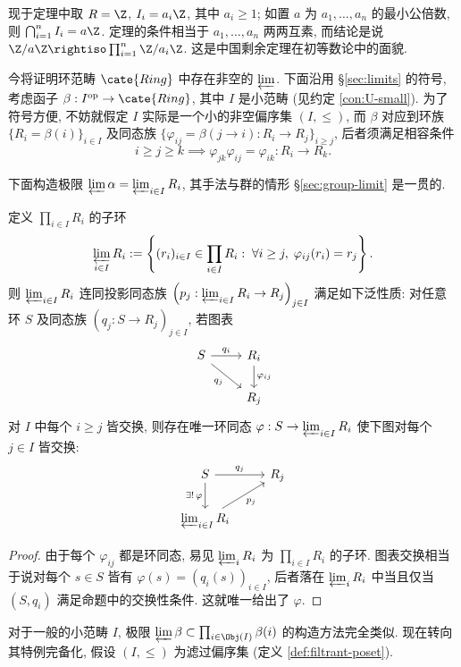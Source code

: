 现于定理中取 $R=\Z$, $I_i = a_i \Z$, 其中 $a_i \geq 1$; 如置 $a$ 为 $a_1, \ldots, a_n$ 的最小公倍数, 则 $\bigcap_{i=1}^n I_i = a\Z$. 定理的条件相当于 $a_1, \ldots, a_n$ 两两互素, 而结论是说 $\Z/a\Z \rightiso \prod_{i=1}^n \Z/a_i\Z$. 这是中国剩余定理在初等数论中的面貌.

今将证明环范畴 $\cate{Ring}$  中存在非空的 $\varprojlim$. 下面沿用 \S\ref{sec:limits} 的符号, 考虑函子 $\beta: I^\text{op} \to \cate{Ring}$, 其中 $I$ 是小范畴 (见约定 \ref{con:U-small}). 为了符号方便, 不妨就假定 $I$ 实际是一个小的非空偏序集 $(I, \leq)$, 而 $\beta$ 对应到环族 $\{R_i = \beta(i) \}_{i \in I}$ 及同态族 $\{\varphi_{ij} = \beta(j \to i): R_i \to R_j \}_{i \geq j}$, 后者须满足相容条件
\[ i \geq j \geq k \implies \varphi_{jk} \varphi_{ij} = \varphi_{ik}: R_i \to R_k. \]

下面构造极限 $\varprojlim \alpha = \varprojlim_{i \in I} R_i$, 其手法与群的情形 \S\ref{sec:group-limit} 是一贯的.

\begin{proposition}
	定义 $\prod_{i \in I} R_i$ 的子环
	\[ \varprojlim_{i \in I} R_i := \left\{ (r_i)_{i \in I} \in \prod_{i \in I} R_i : \; \forall i \geq j,\; \varphi_{ij}(r_i) = r_j \right\}. \]
	则 $\varprojlim_{i \in I} R_i$ 连同投影同态族 $\left( p_j: \varprojlim_{i \in I} R_i \to R_j \right)_{j \in I}$ 满足如下泛性质: 对任意环 $S$ 及同态族 $(q_j: S \to R_j)_{j \in I}$, 若图表
	\[ \begin{tikzcd}
		S \arrow[r, "q_i"] \arrow[rd, "q_j"'] & R_i \arrow[d, "\varphi_{ij}"] \\
		&  R_j
	\end{tikzcd} \]
	对 $I$ 中每个 $i \geq j$ 皆交换, 则存在唯一环同态 $\varphi: S \to \varprojlim_{i \in I} R_i$ 使下图对每个 $j \in I$ 皆交换:
	\[ \begin{tikzcd}
		S \arrow[r, "q_j"] \arrow[d, "{\exists! \, \varphi}"'] & R_j \\
		\varprojlim_{i \in I} R_i \arrow[ru, "p_j"'] &
	\end{tikzcd} \]
\end{proposition}
\begin{proof}
	由于每个 $\varphi_{ij}$ 都是环同态, 易见 $\varprojlim_i R_i$ 为 $\prod_{i \in I} R_i$ 的子环. 图表交换相当于说对每个 $s \in S$ 皆有 $\varphi(s) = (q_i(s))_{i \in I}$, 后者落在 $\varprojlim_i R_i$ 中当且仅当 $(S, q_i)$ 满足命题中的交换性条件. 这就唯一给出了 $\varphi$.
\end{proof}

对于一般的小范畴 $I$, 极限 $\varprojlim \beta \subset \prod_{i \in \Obj(I)} \beta(i)$ 的构造方法完全类似. 现在转向其特例完备化, 假设 $(I, \leq)$ 为滤过偏序集 (定义 \ref{def:filtrant-poset}).

